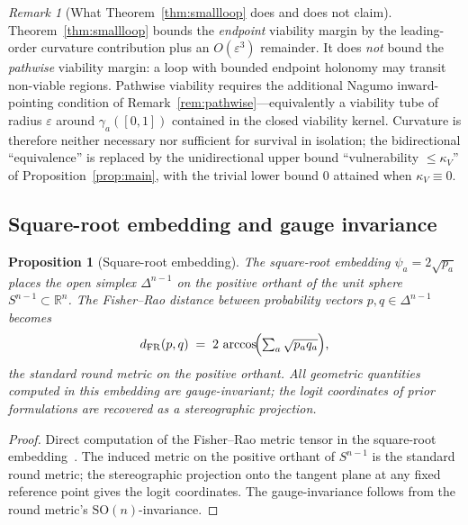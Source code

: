 \documentclass[11pt,a4paper]{article}
\theoremstyle{plain}
\newtheorem{proposition}[theorem]{Proposition}
\theoremstyle{definition}
\theoremstyle{remark}
\newtheorem{remark}[theorem]{Remark}
\newcommand{\kk}{\kappa_{\!V}}
\newcommand{\RR}{\mathbb{R}}
\newcommand{\SO}{\mathrm{SO}}
\begin{document}
\begin{remark}[What Theorem~\ref{thm:smallloop} does and does not claim]
\label{rem:smallloop-scope}
Theorem~\ref{thm:smallloop} bounds the \emph{endpoint} viability
margin by the leading-order curvature contribution plus an
$O(\varepsilon^3)$ remainder. It does \emph{not} bound the
\emph{pathwise} viability margin: a loop with bounded endpoint
holonomy may transit non-viable regions. Pathwise viability requires
the additional Nagumo inward-pointing condition of
Remark~\ref{rem:pathwise}---equivalently a viability tube of radius
$\varepsilon$ around $\gamma_a([0,1])$ contained in the closed
viability kernel. Curvature is therefore neither necessary nor
sufficient for survival in isolation; the bidirectional
``equivalence'' is replaced by the unidirectional upper bound
``vulnerability $\leq \kk$'' of Proposition~\ref{prop:main}, with
the trivial lower bound $0$ attained when $\kk \equiv 0$.
\end{remark}

\subsection{Square-root embedding and gauge invariance}

\begin{proposition}[Square-root embedding]\label{prop:sqrt}
The square-root embedding $\psi_a = 2\sqrt{p_a}$ places the open simplex
$\Delta^{n-1}$ on the positive orthant of the unit sphere
$S^{n-1}\subset\RR^n$. The Fisher--Rao distance between probability
vectors $p,q\in\Delta^{n-1}$ becomes
\begin{equation}\label{eq:fr}
  d_{\mathrm{FR}}(p,q) \;=\; 2\,\arccos\!\Bigl(\textstyle\sum_a\sqrt{p_a q_a}\Bigr),
\end{equation}
the standard round metric on the positive orthant. All geometric
quantities computed in this embedding are gauge-invariant; the logit
coordinates of prior formulations are recovered as a stereographic
projection.
\end{proposition}

\begin{proof}
Direct computation of the Fisher--Rao metric tensor in the square-root
embedding~\cite{bhattacharyya1943,amari2000}. The induced metric on the
positive orthant of $S^{n-1}$ is the standard round metric; the
stereographic projection onto the tangent plane at any fixed reference
point gives the logit coordinates. The gauge-invariance follows from
the round metric's $\SO(n)$-invariance.
\end{proof}
\end{document}
